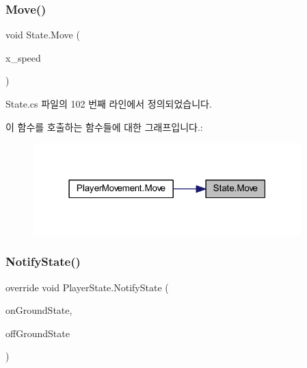 \mbox{\label{class_state_a4424d0f582fe05b9dc7cec2a0a7c735a}} 
\subsubsection{\texorpdfstring{Move()}{Move()}}
{\footnotesize\ttfamily void State.\+Move (\begin{DoxyParamCaption}\item[{float}]{x\+\_\+speed }\end{DoxyParamCaption})\hspace{0.3cm}{\ttfamily [inherited]}}



State.\+cs 파일의 102 번째 라인에서 정의되었습니다.


\begin{DoxyCode}{0}

\end{DoxyCode}
이 함수를 호출하는 함수들에 대한 그래프입니다.\+:
\nopagebreak
\begin{figure}[H]
\begin{center}
\leavevmode
\includegraphics[width=295pt]{d0/d8b/class_state_a4424d0f582fe05b9dc7cec2a0a7c735a_icgraph}
\end{center}
\end{figure}
\mbox{\label{class_player_state_a59f3f64c24ba1b6e34e34cb23746ecb0}} 
\subsubsection{\texorpdfstring{NotifyState()}{NotifyState()}\hspace{0.1cm}{\footnotesize\ttfamily [1/2]}}
{\footnotesize\ttfamily override void Player\+State.\+Notify\+State (\begin{DoxyParamCaption}\item[{\mbox{\hyperlink{class_state_ab9eb1c1d81f1903b8486d1275e78b68e}{On\+Ground}}}]{on\+Ground\+State,  }\item[{\mbox{\hyperlink{class_state_a7d945e793324c017a973205564cf1a56}{Off\+Ground}}}]{off\+Ground\+State }\end{DoxyParamCaption})\hspace{0.3cm}{\ttfamily [virtual]}}



